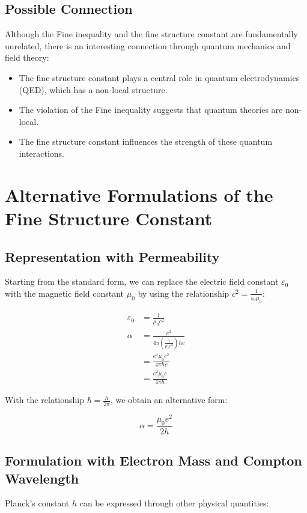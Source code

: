 \documentclass{article}
\begin{document}
	\subsection{Possible Connection}
	Although the Fine inequality and the fine structure constant are fundamentally unrelated, there is an interesting connection through quantum mechanics and field theory:
	
	\begin{itemize}
		\item The fine structure constant plays a central role in quantum electrodynamics (QED), which has a non-local structure.
		\item The violation of the Fine inequality suggests that quantum theories are non-local.
		\item The fine structure constant influences the strength of these quantum interactions.
	\end{itemize}
	
	\section{Alternative Formulations of the Fine Structure Constant}
	
	\subsection{Representation with Permeability}
	Starting from the standard form, we can replace the electric field constant $\varepsilon_0$ with the magnetic field constant $\mu_0$ by using the relationship $c^2 = \frac{1}{\varepsilon_0\mu_0}$:
	
	\begin{align}
		\varepsilon_0 &= \frac{1}{\mu_0c^2}\\
		\alpha &= \frac{e^2}{4\pi\left(\frac{1}{\mu_0c^2}\right)\hbar c}\\
		&= \frac{e^2\mu_0c^2}{4\pi\hbar c}\\
		&= \frac{e^2\mu_0c}{4\pi\hbar}
	\end{align}
	
	With the relationship $\hbar = \frac{h}{2\pi}$, we obtain an alternative form:
	
	\begin{equation}
		\alpha = \frac{\mu_0e^2}{2h}
	\end{equation}
	
	\subsection{Formulation with Electron Mass and Compton Wavelength}
	Planck's constant $h$ can be expressed through other physical quantities:
	
\end{document}
